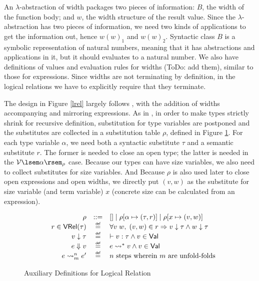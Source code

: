 \documentclass[preprint]{sigplanconf}
\newcommand{\relV}[1]{\mathcal{V}\lsem#1\rsem}
\newcommand\defeq{\mathrel{\overset{\makebox[0pt]{\mbox{\normalfont\tiny\sffamily def}}}{=}}}
\begin{document}
An $\lambda$-abstraction of width packages two pieces of information: $B$, the width of the function body; and $w$, the width structure of the result value. Since the $\lambda$-abstraction has two pieces of information, we need two kinds of applications to get the information out, hence $w(w)_1$ and $w(w)_2$. Syntactic class $B$ is a symbolic representation of natural numbers, meaning that it has abstractions and applications in it, but it should evaluates to a natural number. We also have definitions of values and evaluation rules for widths (ToDo: add them), similar to those for expressions. Since widths are not terminating by definition, in the logical relations we have to explicitly require that they terminate.

The design in Figure \ref{lrel} largely follows \cite{dreyer2009logical}, with the addition of widths accompanying and mirroring expressions. As in \cite{dreyer2009logical}, in order to make types strictly shrink for recursive definition, substitution for type variables are postponed and the substitutes are collected in a substitution table $\rho$, defined in Figure \ref{lrel-aux}. For each type variable $\alpha$, we need both a syntactic substitute $\tau$ and a semantic substitute $r$. The former is needed to close an open type; the latter is needed in the $\relV{\alpha}_\rho$ case. Because our types can have size variables, we also need to collect substitutes for size variables. And Because $\rho$ is also used later to close open expressions and open widths, we directly put $(v,w)$ as the substitute for size variable (and term variable) $x$ (concrete size can be calculated from an expression).

\begin{figure}
$$\begin{array}{rrcl}
  & \rho &::=& [] \mid \rho[\alpha\mapsto(\tau,r)] \mid \rho[x\mapsto(v,w)]\\
  & r\in\mathsf{VRel}(\tau) &\defeq& \forall v\;w,\;(v,w)\in r \Rightarrow v\downarrow\tau \wedge w\downarrow\tau \\
  & v \downarrow \tau &\defeq& \vdash v:\tau \wedge v\in\mathsf{Val} \\
  & e \Downarrow v &\defeq& e\leadsto^*v \wedge v\in\mathsf{Val} \\
  & e \leadsto^n_m e' &\defeq& n\textrm{\ steps\ wherein\ }m\textrm{\ are\ unfold-folds}
\end{array}$$
\caption{\label{lrel-aux}Auxiliary Definitions for Logical Relation}
\end{figure}
\end{document}
